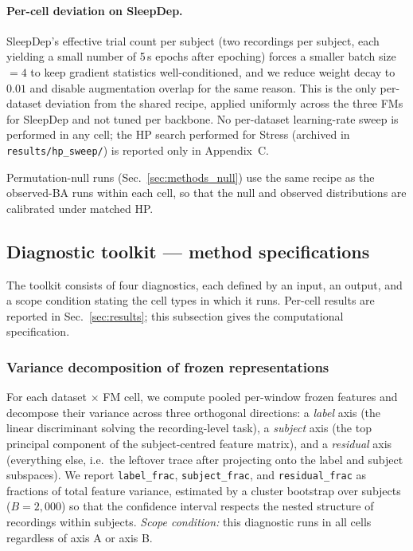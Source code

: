 \paragraph{Per-cell deviation on SleepDep.} SleepDep's effective trial
count per subject (two recordings per subject, each yielding a small
number of 5\,s epochs after epoching) forces a smaller batch
size~$= 4$ to keep gradient statistics well-conditioned, and we reduce
weight decay to $0.01$ and disable augmentation overlap for the same
reason. This is the only per-dataset deviation from the shared recipe,
applied uniformly across the three FMs for SleepDep and not tuned
per backbone. No per-dataset learning-rate sweep is performed in any
cell; the HP search performed for Stress (archived in
\texttt{results/hp\_sweep/}) is reported only in Appendix~C.

Permutation-null runs (Sec.~\ref{sec:methods_null}) use the same
recipe as the observed-BA runs within each cell, so that the null
and observed distributions are calibrated under matched HP.

\subsection{Diagnostic toolkit --- method specifications}
\label{sec:methods_toolkit}

The toolkit consists of four diagnostics, each defined by an input, an
output, and a scope condition stating the cell types in which it
runs. Per-cell results are reported in Sec.~\ref{sec:results}; this
subsection gives the computational specification.

\subsubsection{Variance decomposition of frozen representations}
\label{sec:methods_variance}

For each dataset $\times$ FM cell, we compute pooled per-window frozen
features and decompose their variance across three orthogonal
directions: a \emph{label} axis (the linear discriminant solving
the recording-level task), a \emph{subject} axis (the top principal
component of the subject-centred feature matrix), and a
\emph{residual} axis (everything else, i.e.\ the leftover trace after
projecting onto the label and subject subspaces). We report
\texttt{label\_frac}, \texttt{subject\_frac}, and
\texttt{residual\_frac} as fractions of total feature variance,
estimated by a cluster bootstrap over subjects ($B=2{,}000$)
\citep{field2007clusterbootstrap} so that the confidence interval
respects the nested structure of recordings within subjects.
\emph{Scope condition:} this diagnostic runs in all cells regardless
of axis A or axis B.

